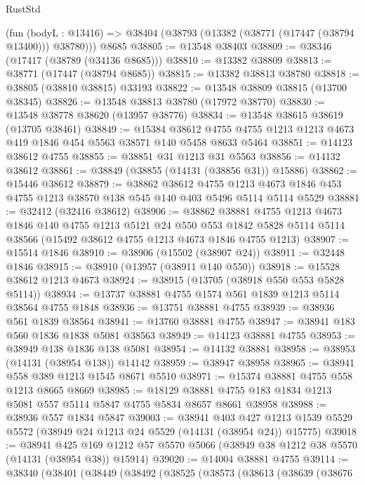 \begin{lexlean}{RustStd}
\begin{coremodule}
    (fun (bodyL : @13416) => @38404 (@38793 (@13382 (@38771 (@17447 (@38794 @13400))) @38780)))
    @8685
@38805 := @13548 @38403
@38809 := @38346 (@17417 (@38789 (@34136 @8685)))
@38810 := @13382 @38809
@38813 := @38771 (@17447 (@38794 @8685))
@38815 := @13382 @38813 @38780
@38818 := @38805 (@38810 @38815) @33193
@38822 := @13548 @38809 @38815 (@13700 @38345)
@38826 := @13548 @38813 @38780 (@17972 @38770)
@38830 := @13548 @38778 @38620 (@13957 @38776)
@38834 := @13548 @38615 @38619 (@13705 @38461)
@38849 := @15384
    @38612
    @4755
    @4755
    @1213
    @1213
    @4673
    @419
    @1846
    @454
    @5563
    @38571
    @140
    @5458
    @8633
    @5464
@38851 := @14123 @38612 @4755
@38855 := @38851 @31 @1213 @31 @5563
@38856 := @14132 @38612
@38861 := @38849 (@38855 (@14131 (@38856 @31)) @15886)
@38862 := @15446 @38612
@38879 := @38862
    @38612
    @4755
    @1213
    @4673
    @1846
    @453
    @4755
    @1213
    @38570
    @138
    @545
    @140
    @403
    @5496
    @5114
    @5114
    @5529
@38881 := @32412 (@32416 @38612)
@38906 := @38862
    @38881
    @4755
    @1213
    @4673
    @1846
    @140
    @4755
    @1213
    @5121
    @24
    @550
    @553
    @1842
    @5828
    @5114
    @5114
    @38566
    (@15492 @38612 @4755 @1213 @4673 @1846 @4755 @1213)
@38907 := @15514 @1846
@38910 := @38906 (@15502 (@38907 @24))
@38911 := @32448 @1846
@38915 := @38910 (@13957 (@38911 @140 @550))
@38918 := @15528 @38612 @1213 @4673
@38924 := @38915 (@13705 (@38918 @550 @553 @5828 @5114))
@38934 := @13737 @38881 @4755 @1574 @561 @1839 @1213 @5114 @38564 @4755 @1848
@38936 := @13751 @38881 @4755
@38939 := @38936 @561 @1839 @38564
@38941 := @13760 @38881 @4755
@38947 := @38941 @183 @560 @1836 @1838 @5081 @38563
@38949 := @14123 @38881 @4755
@38953 := @38949 @138 @1836 @138 @5081
@38954 := @14132 @38881
@38958 := @38953 (@14131 (@38954 @138)) @14142
@38959 := @38947 @38958
@38965 := @38941 @558 @389 @1213 @1545 @8671 @5510
@38971 := @15374 @38881 @4755 @558 @1213 @8665 @8669
@38985 := @18129 @38881 @4755 @183 @1834 @1213 @5081 @557 @5114 @5847 @4755 @5834 @8657 @8661 @38958
@38988 := @38936 @557 @1834 @5847
@39003 := @38941
    @403
    @427
    @1213
    @1539
    @5529
    @5572
    (@38949 @24 @1213 @24 @5529 (@14131 (@38954 @24)) @15775)
@39018 := @38941
    @425
    @169
    @1212
    @57
    @5570
    @5066
    (@38949 @38 @1212 @38 @5570 (@14131 (@38954 @38)) @15914)
@39020 := @14004 @38881 @4755
@39114 := @38340
    (@38401
      (@38449
        (@38492
          (@38525
            (@38573
              (@38613
                (@38639
                  (@38676

\end{coremodule}
\end{lexlean}
